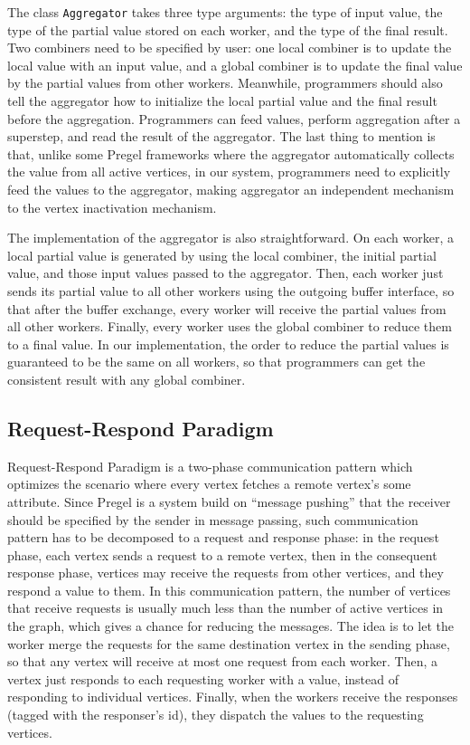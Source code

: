 \documentclass{sokendai_thesis} %
\begin{document}
The class \texttt{Aggregator} takes three type arguments: the type of input value, the type of the partial value stored on each worker, and the type of the final result.
Two combiners need to be specified by user: one local combiner is to update the local value with an input value, and a global combiner is to update the final value by the partial values from other workers.
Meanwhile, programmers should also tell the aggregator how to initialize the local partial value and the final result before the aggregation.
Programmers can feed values, perform aggregation after a superstep, and read the result of the aggregator.
The last thing to mention is that, unlike some Pregel frameworks where the aggregator automatically collects the value from all active vertices, in our system, programmers need to explicitly feed the values to the aggregator, making aggregator an independent mechanism to the vertex inactivation mechanism.

The implementation of the aggregator is also straightforward.
On each worker, a local partial value is generated by using the local combiner, the initial partial value, and those input values passed to the aggregator.
Then, each worker just sends its partial value to all other workers using the outgoing buffer interface, so that after the buffer exchange, every worker will receive the partial values from all other workers.
Finally, every worker uses the global combiner to reduce them to a final value.
In our implementation, the order to reduce the partial values is guaranteed to be the same on all workers, so that programmers can get the consistent result with any global combiner.

\subsection{Request-Respond Paradigm}

Request-Respond Paradigm \cite{effective} is a two-phase communication pattern which optimizes the scenario where every vertex fetches a remote vertex's some attribute.
Since Pregel is a system build on ``message pushing'' that the receiver should be specified by the sender in message passing, such communication pattern has to be decomposed to a request and response phase:
in the request phase, each vertex sends a request to a remote vertex, then in the consequent response phase, vertices may receive the requests from other vertices, and they respond a value to them.
In this communication pattern, the number of vertices that receive requests is usually much less than the number of active vertices in the graph, which gives a chance for reducing the messages.
The idea is to let the worker merge the requests for the same destination vertex in the sending phase, so that any vertex will receive at most one request from each worker.
Then, a vertex just responds to each requesting worker with a value, instead of responding to individual vertices.
Finally, when the workers receive the responses (tagged with the responser's id), they dispatch the values to the requesting vertices.
\end{document}
